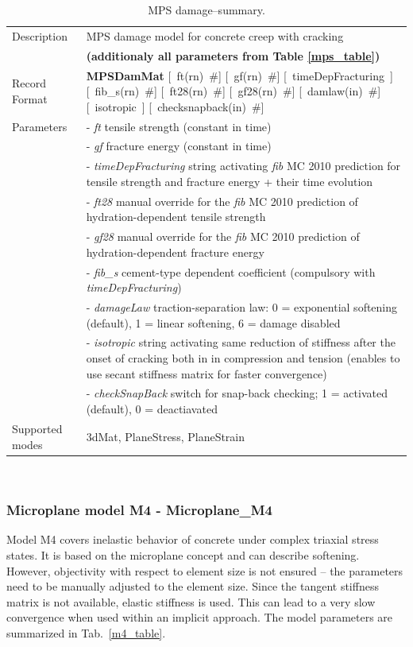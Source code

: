 \documentclass[a4paper]{article}
\newcommand{\descitem}[1]{{\noindent \bf #1}}
\newcommand{\elemparam}[2]{{{#1\tiny (#2)}~\#}}
\newcommand{\optelemparam}[2]{[{~\elemparam{#1}{#2}}]}
\newcommand{\elemstring}[1]{{#1}}
\newcommand{\optelemstring}[1]{[{~\elemstring{#1}~}]}
\newcommand{\param}[1]{{\it #1}}
\newenvironment{mmt}{\begin{tabular}{|l|p{9cm}|}}{\end{tabular}\\}
\newenvironment{mmt}{\begin{tabular}{|l|l|}}{\end{tabular}\\}
\begin{document}
\begin{table}[!htb]
\begin{mmt}
\hline
Description & MPS damage model for concrete creep with cracking\\
& \textbf{(additionaly all parameters from Table \ref{mps_table})}\\
\hline
Record Format & \descitem{MPSDamMat} 
\optelemparam{ft}{rn} 
\optelemparam{gf}{rn} 
\optelemstring{timeDepFracturing}
\optelemparam{fib\_s}{rn}
\optelemparam{ft28}{rn} 
\optelemparam{gf28}{rn} 
%
\optelemparam{damlaw}{in}
\optelemstring{isotropic}
\optelemparam{checksnapback}{in}
%          
\\Parameters 
&- \param{ft} tensile strength (constant in time)\\
&- \param{gf} fracture energy (constant in time)\\
&- \param{timeDepFracturing} string activating {\sl{fib}} MC 2010 prediction for 
tensile strength and fracture energy + their time evolution\\
&- \param{ft28} manual override for the {\sl{fib}} MC 2010 prediction of hydration-dependent tensile strength\\
&- \param{gf28} manual override for the {\sl{fib}} MC 2010 prediction of hydration-dependent fracture energy\\
&- \param{fib\_s} cement-type dependent coefficient (compulsory with \param{timeDepFracturing})\\ 
&- \param{damageLaw} traction-separation law: 0 = exponential softening (default), 1 = linear softening, 6 = damage disabled \\
&- \param{isotropic} string activating same reduction of stiffness after the onset of cracking both in in compression and tension (enables to use secant stiffness matrix for faster convergence)\\
&- \param{checkSnapBack} switch for snap-back checking; 1 = activated (default), 0 = deactiavated\\
%
Supported modes& 3dMat, PlaneStress, PlaneStrain\\
\hline
\end{mmt}

\caption{MPS damage--summary.}
\label{mps_dam_table}

\end{table}






\clearpage


\subsubsection{Microplane model M4 - Microplane\_M4}
Model M4 covers inelastic behavior of concrete under complex
triaxial stress states. It is based on the microplane concept and
can describe softening. However, 
objectivity with respect
to element size is not ensured -- the parameters need to be manually adjusted
to the element size. Since the tangent stiffness matrix is not available, 
elastic stiffness is used. This can lead to a very slow convergence 
when used within an implicit approach.
The model parameters are summarized
in Tab.~\ref{m4_table}.
\end{document}
